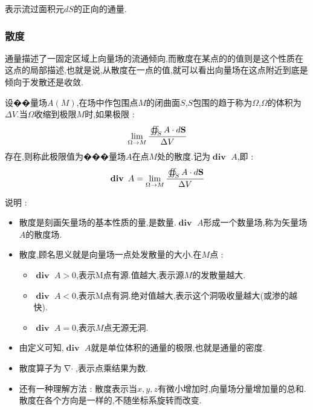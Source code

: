 \documentclass[UTF8,12pt]{ctexbook}
\newcommand{\limNormal}[1]{\lim\limits_{#1}}
\newcommand{\doubleCurveIntegralOnZone}[1]{\oiint_{#1}}
\DeclareMathOperator{\divergenceText}{\mathbf{div}\ }
\DeclareMathOperator{\divergenceSymbol}{\nabla\cdot}
\begin{document}
{{{{{\begin{itemize}
{              表示流过面积元$dS$的正向的通量.
              }
      \end{itemize}
    }%

    \subsubsection{散度}{
      通量描述了一固定区域上向量场的流通倾向,而散度在某点的的值则是这个性质在这点的局部描述,也就是说,从散度在一点的值,就可以看出向量场在这点附近到底是倾向于发散还是收敛.

      设��量场$A(M)$,在场中作包围点$M$的闭曲面$S$,$S$包围的趋于称为$\Omega$,$\Omega$的体积为$\Delta V$.当$\Omega$收缩到极限$M$时,如果极限 :
      $$
        \limNormal{\Omega \to M}\cfrac{\doubleCurveIntegralOnZone{S}A \cdot d\mathbf{S}}{\Delta V}
      $$
      存在,则称此极限值为���量场$A$在点$M$处的散度.记为$\divergenceText A$,即 :
      $$
        \divergenceText A = \limNormal{\Omega \to M}\cfrac{\doubleCurveIntegralOnZone{S}A \cdot d\mathbf{S}}{\Delta V}
      $$

      说明 :
      \begin{itemize}
        \item {
              散度是刻画矢量场的基本性质的量,是数量.$\divergenceText A$形成一个数量场,称为矢量场$A$的散度场.
              }
        \item {
              散度,顾名思义就是向量场一点处发散量的大小.在$M$点 :
              \begin{itemize}
                \item $\divergenceText A > 0$,表示M点有源.值越大,表示源$M$的发散量越大.
                \item $\divergenceText A < 0$,表示M点有洞.绝对值越大,表示这个洞吸收量越大(或渗的越快).
                \item $\divergenceText A = 0$,表示$M$点无源无洞.
              \end{itemize}
              }
        \item {
              由定义可知,$\divergenceText A$就是单位体积的通量的极限,也就是通量的密度.
              }
        \item {
              散度算子为$\divergenceSymbol$,表示点乘结果为数.
              }
        \item {
              还有一种理解方法 : 散度表示当$x,y,z$有微小增加时,向量场分量增加量的总和.散度在各个方向是一样的,不随坐标系旋转而改变.
              }
      \end{itemize}
    }%

}}}}
\end{document}
